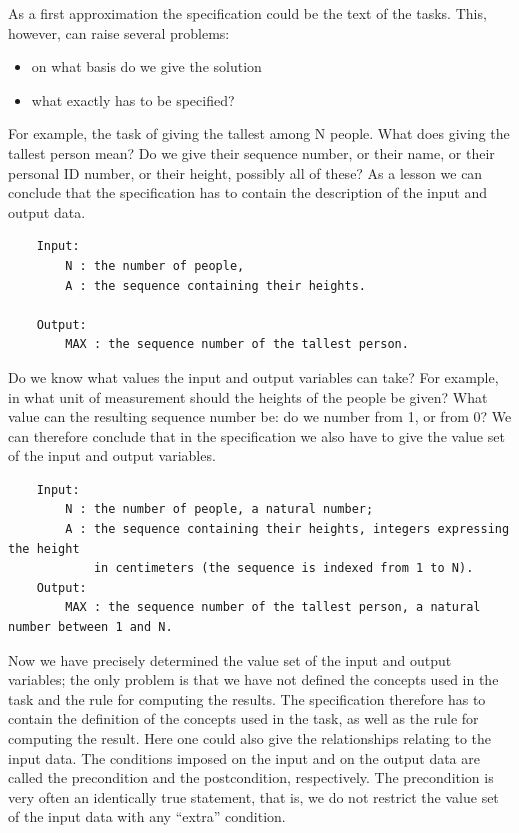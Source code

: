 \documentclass[margin=0px]{article}
\begin{document}
As a first approximation the specification could be the text of the tasks. This, however, can raise several problems:

\begin{itemize}
    \item on what basis do we give the solution
    \item what exactly has to be specified?
\end{itemize}

For example, the task of giving the tallest among N people. What does giving the tallest person mean? Do we give their sequence number, or their name, or their personal ID number, or their height, possibly all of these?
As a lesson we can conclude that the specification has to contain the description of the input and output data.

\begin{verbatim}
	Input:
	    N : the number of people,
	    A : the sequence containing their heights.

	Output:
	    MAX : the sequence number of the tallest person.
	\end{verbatim}


Do we know what values the input and output variables can take? For example, in what unit of measurement should the heights of the people be given? What value can the resulting sequence number be: do we number from 1, or from 0? We can therefore conclude that in the specification we also have to give the value set of the input and output variables.

\begin{verbatim}
	Input:
	    N : the number of people, a natural number;
	    A : the sequence containing their heights, integers expressing the height
	        in centimeters (the sequence is indexed from 1 to N).
	Output:
	    MAX : the sequence number of the tallest person, a natural number between 1 and N.
	\end{verbatim}

Now we have precisely determined the value set of the input and output variables; the only problem is that we have not defined the concepts used in the task and the rule for computing the results. The specification therefore has to contain the definition of the concepts used in the task, as well as the rule for computing the result. Here one could also give the relationships relating to the input data. The conditions imposed on the input and on the output data are called the precondition and the postcondition, respectively. The precondition is very often an identically true statement, that is, we do not restrict the value set of the input data with any ``extra'' condition.
\end{document}
